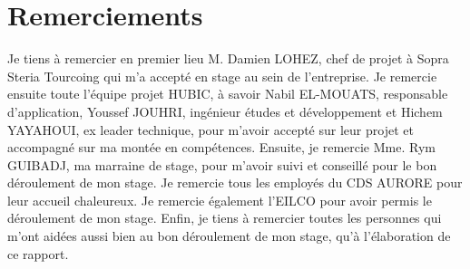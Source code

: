 \section*{Remerciements}
\begin{center}
	
Je tiens à remercier en premier lieu M. Damien LOHEZ, chef de projet à Sopra Steria Tourcoing qui m'a accepté en stage au sein de l'entreprise.
\newline
\newline
Je remercie ensuite toute l'équipe projet HUBIC, à savoir Nabil EL-MOUATS, responsable d'application, Youssef JOUHRI, ingénieur études et développement et Hichem YAYAHOUI, ex leader technique, pour m'avoir accepté sur leur projet et accompagné sur ma montée en compétences.
\newline
\newline
Ensuite, je remercie Mme. Rym GUIBADJ, ma marraine de stage, pour m'avoir suivi et conseillé pour le bon déroulement de mon stage.
\newline
\newline
Je remercie tous les employés du CDS AURORE pour leur accueil chaleureux.
\newline
\newline
Je remercie également l'EILCO pour avoir permis le déroulement de mon stage.
\newline
\newline
Enfin, je tiens à remercier toutes les personnes qui m'ont aidées aussi bien au bon déroulement de mon stage, qu'à l'élaboration de ce rapport.
\end{center}